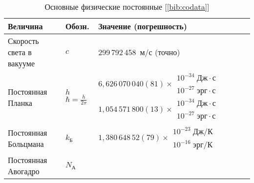 \newcommand*{\z}{\phantom{0}}
\newcommand*{\zz}{\phantom{00}}

\pagestyle{empty}
\begin{booksupplement}
\begin{longtable}{p{46mm}>{\centering}p{14mm}p{45mm}}
\caption{Основные физические постоянные [\ref{bib:codata}]}\\
\toprule[1pt]
\textbf{Величина}     & \textbf{Обозн.} & \textbf{Значение (погрешность)} \\
\midrule[1pt]
Скорость света в вакууме
                      & $c$
                      & 299\,792\,458~м/с (точно)                         \\
Постоянная Планка     & \hfil$h$\newline \newline
                        $\hbar=\frac{h}{2\pi}$
                      & $6,626\,070\,040(81)\times \!\!
                            \begin{array}{l}
                                10^{-34}\;Дж\cdot с \\[-2pt]
                                10^{-27}\;эрг\cdot с
                            \end{array} $ \newline
                        $1,054\,571\,800(13)\times \!\!
                            \begin{array}{l}
                                10^{-34}\;Дж\cdot с \\[-2pt]
                                10^{-27}\;эрг\cdot с
                            \end{array}$                                 \\
Постоянная Больцмана  & $k_{Б}$
                      & $1,380\,648\,52(79)\times \!\!
                        \begin{array}{l}
                            10^{-23}\;Дж/К \\[-2pt]
                            10^{-16}\;эрг/К
                        \end{array}$                                    \\
Постоянная Авогадро   & $N_{А}$

\end{longtable}
\end{booksupplement}
